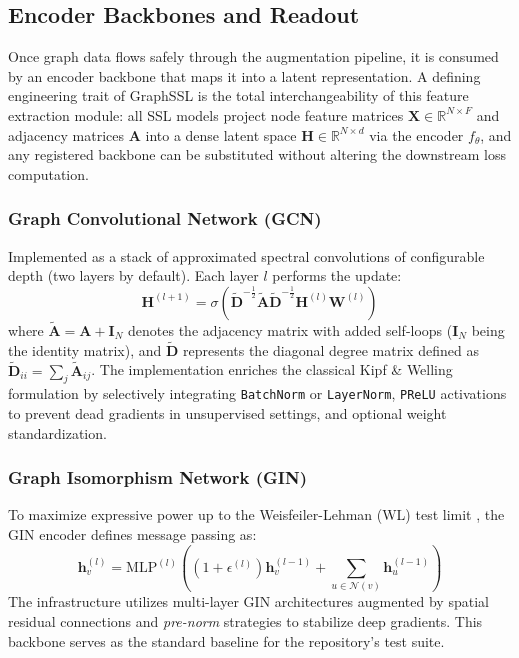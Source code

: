 \documentclass[conference]{IEEEtran}
\begin{document}
\subsection{Encoder Backbones and Readout}
Once graph data flows safely through the augmentation pipeline, it is consumed by an encoder backbone that maps it into a latent representation. A defining engineering trait of GraphSSL is the total interchangeability of this feature extraction module: all SSL models project node feature matrices $\bm{X} \in \mathbb{R}^{N \times F}$ and adjacency matrices $\bm{A}$ into a dense latent space $\bm{H} \in \mathbb{R}^{N \times d}$ via the encoder $f_\theta$, and any registered backbone can be substituted without altering the downstream loss computation.

\subsubsection{Graph Convolutional Network (GCN)}
Implemented as a stack of approximated spectral convolutions \cite{gcn} of configurable depth (two layers by default). Each layer $l$ performs the update:
\begin{equation}
\bm{H}^{(l+1)} = \sigma\left( \tilde{\bm{D}}^{-\frac{1}{2}} \tilde{\bm{A}} \tilde{\bm{D}}^{-\frac{1}{2}} \bm{H}^{(l)} \bm{W}^{(l)} \right)
\end{equation}
where $\tilde{\bm{A}} = \bm{A} + \bm{I}_N$ denotes the adjacency matrix with added self-loops ($\bm{I}_N$ being the identity matrix), and $\tilde{\bm{D}}$ represents the diagonal degree matrix defined as $\tilde{\bm{D}}_{ii} = \sum_{j} \tilde{\bm{A}}_{ij}$. The implementation enriches the classical Kipf \& Welling formulation by selectively integrating \texttt{BatchNorm} or \texttt{LayerNorm}, \texttt{PReLU} activations to prevent dead gradients in unsupervised settings, and optional weight standardization.

\subsubsection{Graph Isomorphism Network (GIN)}
To maximize expressive power up to the Weisfeiler-Lehman (WL) test limit \cite{wl,gin}, the GIN encoder defines message passing as:
\begin{equation}
\bm{h}_v^{(l)} = \text{MLP}^{(l)} \left( (1 + \epsilon^{(l)}) \bm{h}_v^{(l-1)} + \sum_{u \in \mathcal{N}(v)} \bm{h}_u^{(l-1)} \right)
\end{equation}
The infrastructure utilizes multi-layer GIN architectures augmented by spatial residual connections and \textit{pre-norm} strategies to stabilize deep gradients. This backbone serves as the standard baseline for the repository's test suite.
\end{document}
